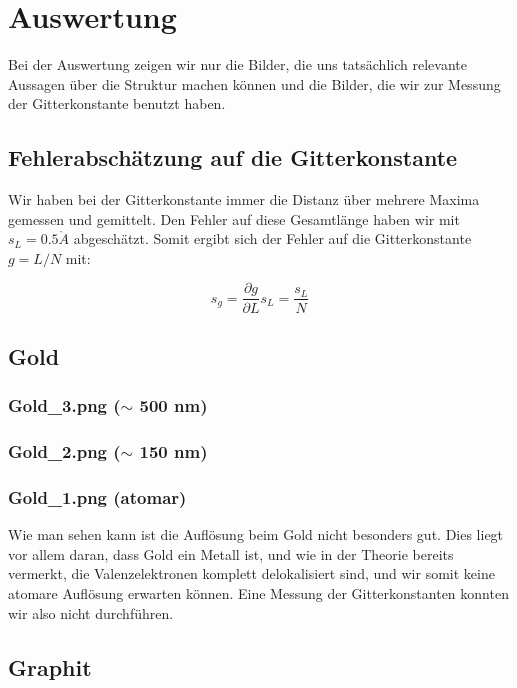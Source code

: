 \section{Auswertung}

Bei der Auswertung zeigen wir nur die Bilder, die uns tatsächlich relevante Aussagen über die Struktur machen können und die Bilder, die wir zur Messung der Gitterkonstante benutzt haben.

\subsection{Fehlerabschätzung auf die Gitterkonstante}

Wir haben bei der Gitterkonstante immer die Distanz über mehrere Maxima gemessen und gemittelt. Den Fehler auf diese Gesamtlänge haben wir mit $s_L = 0.5 \mathring A$ abgeschätzt. Somit ergibt sich der Fehler auf die Gitterkonstante $g=L/N$ mit:

$$s_g = \frac{\partial g}{\partial L}s_L = \frac{s_L}{N}$$

\subsection{Gold}

\subsubsection{Gold\_3.png ($\sim$ 500 nm)}
\subsubsection{Gold\_2.png ($\sim$ 150 nm)}
\subsubsection{Gold\_1.png (atomar)}

Wie man sehen kann ist die Auflösung beim Gold nicht besonders gut. Dies liegt vor allem daran, dass Gold ein Metall ist, und wie in der Theorie bereits vermerkt, die Valenzelektronen komplett delokalisiert sind, und wir somit keine atomare Auflösung erwarten können. Eine Messung der Gitterkonstanten konnten wir also nicht durchführen.

\subsection{Graphit}

